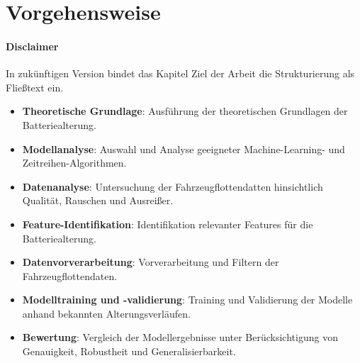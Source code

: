 \section{Vorgehensweise}
\paragraph{Disclaimer} In zukünftigen Version bindet das Kapitel Ziel der Arbeit die Strukturierung als Fließtext ein.
 
\begin{itemize}
    \item \textbf{Theoretische Grundlage}: Ausführung der theoretischen Grundlagen der Batteriealterung.
    \item \textbf{Modellanalyse}: Auswahl und Analyse geeigneter Machine-Learning- und Zeitreihen-Algorithmen.
    \item \textbf{Datenanalyse}: Untersuchung der Fahrzeugflottendatten hinsichtlich Qualität, Rauschen und Ausreißer.
    \item \textbf{Feature-Identifikation}: Identifikation relevanter Features für die Batteriealterung.
    \item \textbf{Datenvorverarbeitung}: Vorverarbeitung und Filtern der Fahrzeugflottendaten.
    \item \textbf{Modelltraining und -validierung}: Training und Validierung der Modelle anhand bekannten Alterungsverläufen.
    \item \textbf{Bewertung}: Vergleich der Modellergebnisse unter Berücksichtigung von Genauigkeit, Robustheit und Generalisierbarkeit.
\end{itemize}
